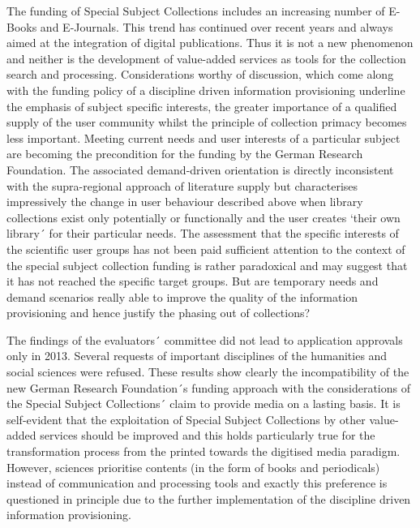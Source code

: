 \documentclass[a4paper,
fontsize=11pt,
oneside,
numbers=noperiodatend,
parskip=half-,
bibliography=totoc,
final
]{scrartcl}
\begin{document}
The funding of Special Subject Collections includes an increasing number
of E-Books and E-Journals. This trend has continued over recent years
and always aimed at the integration of digital publications. Thus it is
not a new phenomenon and neither is the development of value-added
services as tools for the collection search and processing.
Considerations worthy of discussion, which come along with the funding
policy of a discipline driven information provisioning underline the
emphasis of subject specific interests, the greater importance of a
qualified supply of the user community whilst the principle of
collection primacy becomes less important. Meeting current needs and
user interests of a particular subject are becoming the precondition for
the funding by the German Research Foundation. The associated
demand-driven orientation is directly inconsistent with the
supra-regional approach of literature supply but characterises
impressively the change in user behaviour described above when library
collections exist only potentially or functionally and the user creates
`their own library´ for their particular needs. The assessment that the
specific interests of the scientific user groups has not been paid
sufficient attention to the context of the special subject collection
funding is rather paradoxical and may suggest that it has not reached
the specific target groups. But are temporary needs and demand scenarios
really able to improve the quality of the information provisioning and
hence justify the phasing out of collections?

The findings of the evaluators´ committee did not lead to application
approvals only in 2013. Several requests of important disciplines of the
humanities and social sciences were refused. These results show clearly
the incompatibility of the new German Research Foundation´s funding
approach with the considerations of the Special Subject Collections´
claim to provide media on a lasting basis. It is self-evident that the
exploitation of Special Subject Collections by other value-added
services should be improved and this holds particularly true for the
transformation process from the printed towards the digitised media
paradigm. However, sciences prioritise contents (in the form of books
and periodicals) instead of communication and processing tools and
exactly this preference is questioned in principle due to the further
implementation of the discipline driven information provisioning.
\end{document}
